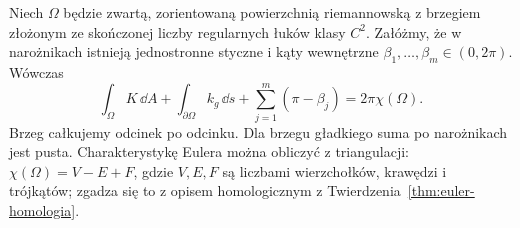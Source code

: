 \begin{twierdzenie}
\label{thm:gauss-bonnet-brzeg}
Niech $\Omega$ będzie zwartą, zorientowaną powierzchnią
riemannowską z brzegiem złożonym ze skończonej liczby
regularnych łuków klasy $C^2$. Załóżmy, że w narożnikach
istnieją jednostronne styczne i kąty wewnętrzne
$\beta_1,\ldots,\beta_m\in(0,2\pi)$. Wówczas
\begin{equation}\label{eq:gauss-bonnet-brzeg}
 \boxed{\displaystyle
 \int_\Omega K\,\dd A
 +\int_{\partial\Omega}k_g\,\dd s
 +\sum_{j=1}^m(\pi-\beta_j)
 =2\pi\chi(\Omega).}
\end{equation}
Brzeg całkujemy odcinek po odcinku. Dla brzegu gładkiego
suma po narożnikach jest pusta. Charakterystykę Eulera
można obliczyć z triangulacji:
$\chi(\Omega)=V-E+F$, gdzie $V,E,F$ są liczbami
wierzchołków, krawędzi i trójkątów; zgadza się to z
opisem homologicznym z
Twierdzenia~\ref{thm:euler-homologia}.
\end{twierdzenie}


